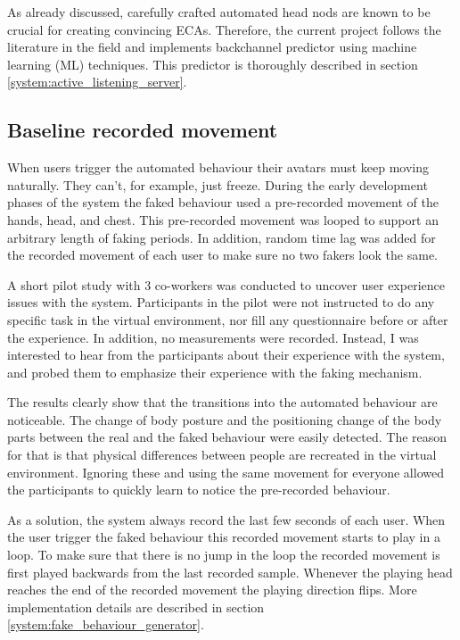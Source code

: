 \documentclass[]{simple-thesis}
\begin{document}
As already discussed, carefully crafted automated head nods are known to be crucial for creating convincing ECAs.
Therefore, the current project follows the literature in the field and implements backchannel predictor using machine learning (ML) techniques.
This predictor is thoroughly described in section \ref{system:active_listening_server}.

\subsection{Baseline recorded movement}

When users trigger the automated behaviour their avatars must keep moving naturally.
They can't, for example, just freeze.
During the early development phases of the system the faked behaviour used a pre-recorded movement of the hands, head, and chest.
This pre-recorded movement was looped to support an arbitrary length of faking periods.
In addition, random time lag was added for the recorded movement of each user to make sure no two fakers look the same.

A short pilot study with 3 co-workers was conducted to uncover user experience issues with the system.
Participants in the pilot were not instructed to do any specific task in the virtual environment, nor fill any questionnaire before or after the experience.
In addition, no measurements were recorded.
Instead, I was interested to hear from the participants about their experience with the system, and probed them to emphasize their experience with the faking mechanism.

The results clearly show that the transitions into the automated behaviour are noticeable.
The change of body posture and the positioning change of the body parts between the real and the faked behaviour were easily detected.
The reason for that is that physical differences between people are recreated in the virtual environment.
Ignoring these and using the same movement for everyone allowed the participants to quickly learn to notice the pre-recorded behaviour.

As a solution, the system always record the last few seconds of each user.
When the user trigger the faked behaviour this recorded movement starts to play in a loop.
To make sure that there is no jump in the loop the recorded movement is first played backwards from the last recorded sample.
Whenever the playing head reaches the end of the recorded movement the playing direction flips.
More implementation details are described in section \ref{system:fake_behaviour_generator}.
\end{document}
